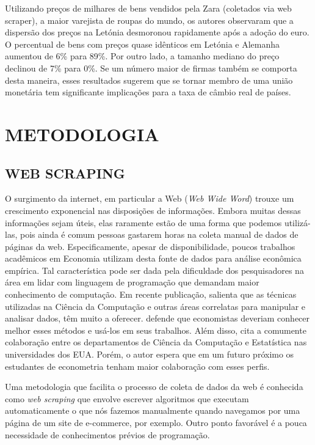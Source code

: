 \documentclass[twoside,a4paper,12pt]{report}
\begin{document}
Utilizando preços de milhares de bens vendidos pela Zara (coletados via web scraper), a maior varejista de roupas do mundo, os autores observaram que a dispersão dos preços na Letónia desmoronou rapidamente após a adoção do euro. O percentual de bens com preços quase idênticos em Letónia e Alemanha aumentou de 6\% para 89\%. Por outro lado, a tamanho mediano do preço declinou de 7\% para 0\%. Se um número maior de firmas também se comporta desta maneira, esses resultados sugerem que se tornar membro de uma união monetária tem significante implicações para a taxa de câmbio real de países. 


\pagestyle{empty}
\cleardoublepage
\pagestyle{fancy}

\chapter{METODOLOGIA}\label{cap3}

\section*{WEB SCRAPING}

O surgimento da internet, em particular a Web (\emph{Web Wide Word}) trouxe um crescimento exponencial nas disposições de informações. Embora muitas dessas informações sejam úteis, elas raramente estão de uma forma que podemos utilizá-las, pois ainda é comum pessoas gastarem horas na coleta manual de dados de páginas da web.
Especificamente, apesar de disponibilidade, poucos trabalhos acadêmicos em Economia utilizam desta fonte de dados para análise econômica empírica. Tal característica pode ser dada pela dificuldade dos pesquisadores na área em lidar com linguagem de programação que demandam maior conhecimento de computação. Em recente publicação, \citet{varian2014big} salienta que as técnicas utilizadas na Ciência da Computação e outras áreas correlatas para manipular e analisar dados, têm muito a oferecer. \citet{varian2014big} defende que economistas deveriam conhecer melhor esses métodos e usá-los em seus trabalhos. Além disso, \citet{varian2014big} cita a comumente colaboração entre os departamentos de Ciência da Computação e Estatística nas universidades dos EUA. Porém, o autor espera que em um futuro próximo os estudantes de econometria tenham maior colaboração com esses perfis. 

Uma metodologia que facilita o processo de coleta de dados da web é conhecida como \emph{web scraping} que envolve escrever algoritmos que executam automaticamente o que nós fazemos manualmente quando navegamos por uma página de um site de e-commerce, por exemplo. Outro ponto favorável é a pouca necessidade de conhecimentos prévios de programação. 
\end{document}
